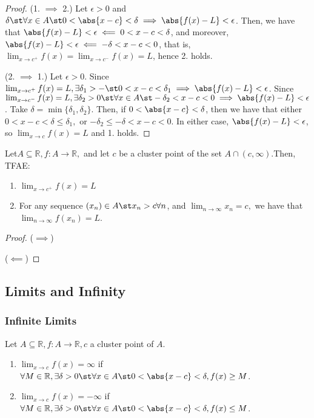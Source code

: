 \documentclass[12pt]{article}
\begin{document}
\begin{proof}
  (1. $\implies$ 2.) Let $\epsilon > 0$ and $\delta \st \forall x \in A \st 0 < \abs{x - c} < \delta \implies \abs{f(x) - L} < \epsilon$. Then, we have that $\abs{f(x) - L} < \epsilon \impliedby 0 < x - c < \delta$, and moreover, $\abs{f(x) - L} < \epsilon \impliedby -\delta < x - c < 0$, that is, $\lim_{x\to c^+} f(x) = \lim_{x \to c^-} f(x) = L$, hence 2. holds.

  \noindent (2. $\implies$ 1.) Let $\epsilon > 0$. Since $\lim_{x\to c^+} f(x) = L, \exists \delta_1 > - \st 0 < x - c < \delta_1 \implies \abs{f(x) - L} < \epsilon$. Since $\lim_{x\to c^-} f(x) = L, \exists \delta_2 > 0 \st \forall x \in A \st - \delta_2 < x - c < 0 \implies \abs{f(x) - L} < \epsilon$. Take $\delta = \min \{\delta_1, \delta_2\}$. Then, if $0 < \abs{x - c} < \delta$, then we have that either $0 < x - c < \delta \leq \delta_1,$ or $- \delta_2 \leq - \delta < x - c < 0$. In either case, $\abs{f(x) - L} < \epsilon$, so $\lim_{x\to c}f(x) = L$ and 1. holds. 
\end{proof}

\begin{theorem}\label{thm:sequentialrightlimit}
  Let\footnotemark $A \subseteq \mathbb{R}, f : A \to \mathbb{R},$ and let $c$ be a cluster point of the set \(A \cap (c, \infty).\)Then, TFAE:
  \begin{enumerate}
    \item $\lim_{x\to c^+} f(x) = L$
    \item For any sequence $(x_n) \in A \st x_n > c \forall n$, and $\lim_{n\to\infty} x_n = c,$ we have that $\lim_{n\to\infty} f(x_n) = L$. 
  \end{enumerate}
\end{theorem}
\begin{proof}
  ($\implies$)


  \noindent($\impliedby$)
\end{proof}


\subsection{Limits and Infinity}
\subsubsection{Infinite Limits}

\begin{definition}
  Let $A \subseteq \mathbb{R}, f : A \to \mathbb{R}, c$ a cluster point of $A$. 
  \begin{enumerate}
    \item $\lim_{x \to c} f(x) = \infty$ if $\forall M \in \mathbb{R}, \exists \delta > 0 \st \forall x \in A \st 0 < \abs{x - c} < \delta, f(x) \geq M$.
    \item $\lim_{x \to c} f(x) = -\infty$ if $\forall M \in \mathbb{R}, \exists \delta > 0 \st \forall x \in A \st 0 < \abs{x - c} < \delta, f(x) \leq M$.
  \end{enumerate}
\end{definition}
\end{document}
